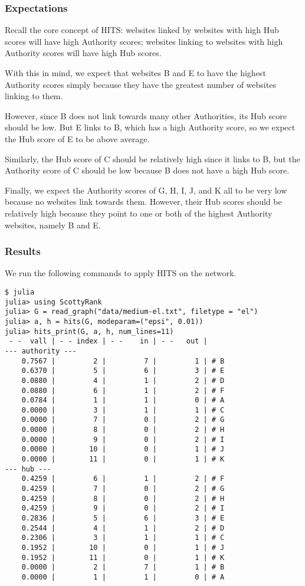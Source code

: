 \documentclass[12pt, titlepage, twoside]{amsart}
\begin{document}
\subsubsection{Expectations}

Recall the core concept of HITS:
websites linked by websites with high Hub scores will have high Authority scores;
websites linking to websites with high Authority scores will have high Hub scores.

With this in mind, we expect that websites B and E to have the highest Authority scores
simply because they have the greatest number of websites linking to them.

However, since B does not link towards many other Authorities, its Hub score should be low.
But E links to B, which has a high Authority score, so we expect the Hub score of E to be above average.

Similarly, the Hub score of C should be relatively high since it links to B, but the Authority score of
C should be low because B does not have a high Hub score.

Finally, we expect the Authority scores of G, H, I, J, and K all to be very low
because no websites link towards them.
However, their Hub scores should be relatively high because they point to
one or both of the highest Authority websites, namely B and E.

\subsubsection{Results}

We run the following commands to apply HITS on the network.

\begin{verbatim}
$ julia
julia> using ScottyRank
julia> G = read_graph("data/medium-el.txt", filetype = "el")
julia> a, h = hits(G, modeparam=("epsi", 0.01))
julia> hits_print(G, a, h, num_lines=11)
 - -  vall | - - index | - -    in | - -   out |
--- authority ---
    0.7567 |         2 |         7 |         1 | # B
    0.6370 |         5 |         6 |         3 | # E
    0.0880 |         4 |         1 |         2 | # D
    0.0880 |         6 |         1 |         2 | # F
    0.0784 |         1 |         1 |         0 | # A
    0.0000 |         3 |         1 |         1 | # C
    0.0000 |         7 |         0 |         2 | # G
    0.0000 |         8 |         0 |         2 | # H
    0.0000 |         9 |         0 |         2 | # I
    0.0000 |        10 |         0 |         1 | # J
    0.0000 |        11 |         0 |         1 | # K
--- hub ---
    0.4259 |         6 |         1 |         2 | # F
    0.4259 |         7 |         0 |         2 | # G
    0.4259 |         8 |         0 |         2 | # H
    0.4259 |         9 |         0 |         2 | # I
    0.2836 |         5 |         6 |         3 | # E
    0.2544 |         4 |         1 |         2 | # D
    0.2306 |         3 |         1 |         1 | # C
    0.1952 |        10 |         0 |         1 | # J
    0.1952 |        11 |         0 |         1 | # K
    0.0000 |         2 |         7 |         1 | # B
    0.0000 |         1 |         1 |         0 | # A
\end{verbatim}
\end{document}
